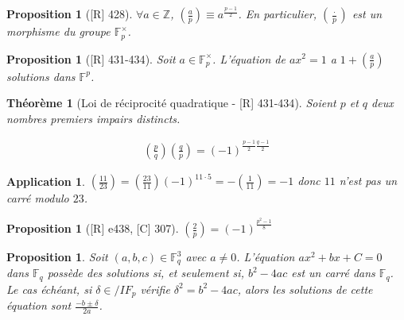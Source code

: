 \documentclass[10pt, a4paper, parskip=full, twoside, twocolumn]{report}
\newtheorem{theorem}[definition]{Théorème}
\newtheorem{proposition}[definition]{Proposition}
\newtheorem{application}[definition]{Application}
\newcommand{\IZ}{\mathbb{Z}}
\newcommand{\IF}{\mathbb{F}}
\begin{document}
\begin{proposition}[\textnormal{[R] 428}]
	$\forall a\in\IZ$, $\left(\frac{a}{p}\right)\equiv a^{\frac{p-1}{2}}$.
	En particulier, $\left(\frac{\cdot}{p}\right)$ est un morphisme du groupe $\IF_p^{\times}$.
\end{proposition}



\begin{tcolorbox}[
    breakable, %
    colback=developpement, %
    colframe=gray!0!black, %
    boxrule=0pt, %
    arc=1mm, %
	boxsep=0pt,
	left=0pt, right=0pt, top=0pt, bottom=0pt
]
\begin{proposition}[\textnormal{[R] 431-434}]
	\label{123dev11}
	Soit $a\in\IF_p^{\times}$. L'équation de $ax^2 = 1$ a $1+\left(\frac{a}{p}\right)$ solutions dans $\IF^p$.
\end{proposition}
\begin{theorem}[Loi de réciprocité quadratique - \textnormal{[R] 431-434}]
	\label{123dev12}
	Soient $p$ et $q$ deux nombres premiers impairs distincts.

	\begin{align*}
		\left(\frac{p}{q}\right)\left(\frac{q}{p}\right) = \left(-1\right)^{\frac{p-1}{2}\frac{q-1}{2}}
	\end{align*}
\end{theorem}
\end{tcolorbox}

\begin{application}
	$\left(\frac{11}{23}\right) = \left(\frac{23}{11}\right)\left(-1\right)^{11\cdot 5} = -\left(\frac{1}{11}\right) = -1$ donc $11$ n'est pas un carré modulo $23$.
\end{application}

\begin{proposition}[\textnormal{[R] e438, [C] 307}]
	$\left(\frac{2}{p}\right) = \left(-1\right)^{\frac{p^2 - 1}{8}}$
\end{proposition}

\begin{proposition}
	Soit $(a,b,c)\in\IF_q^3$ avec $a \neq 0$. L'équation $ax^2 + bx + C = 0$ dans $\IF_q$ 
	possède des solutions si, et seulement si, $b^2-4ac$ est un carré dans $\IF_q$. Le cas échéant, si $\delta\in/IF_p$ vérifie $\delta^2 = b^2-4ac$, alors 
	les solutions de cette équation sont $\frac{-b\pm \delta}{2a}$.
\end{proposition}
\end{document}
